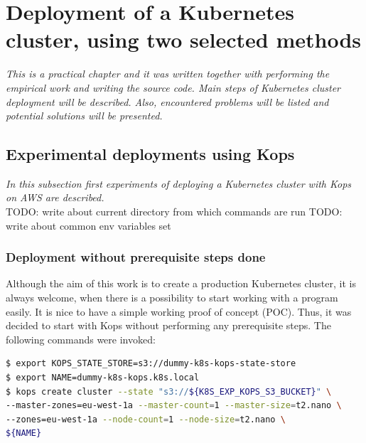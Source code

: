 \section{Deployment of a Kubernetes cluster, using two selected methods}
\textit{This is a practical chapter and it was written together with performing the empirical work and writing the source code. Main steps of Kubernetes cluster deployment will be described. Also, encountered problems will be listed and potential solutions will be presented.}
\\

\subsection{Experimental deployments using Kops}
\textit{In this subsection first experiments of deploying a Kubernetes cluster with Kops on AWS are described.}
\\

TODO: write about current directory from which commands are run
TODO: write about common env variables set

\subsubsection{Deployment without prerequisite steps done}

Although the aim of this work is to create a production Kubernetes cluster, it is always welcome, when there is a possibility to start working with a program easily. It is nice to have a simple working proof of concept (POC). Thus, it was decided to start with Kops without performing any prerequisite steps. The following commands were invoked:
\begin{lstlisting}[basicstyle=\tiny,caption={Commands used to create a cluster with kops, without prerequisite steps performed},captionpos=b,language=Bash,xleftmargin=1cm]
$ export KOPS_STATE_STORE=s3://dummy-k8s-kops-state-store
$ export NAME=dummy-k8s-kops.k8s.local
$ kops create cluster --state "s3://${K8S_EXP_KOPS_S3_BUCKET}" \
--master-zones=eu-west-1a --master-count=1 --master-size=t2.nano \
--zones=eu-west-1a --node-count=1 --node-size=t2.nano \
${NAME}
\end{lstlisting}


